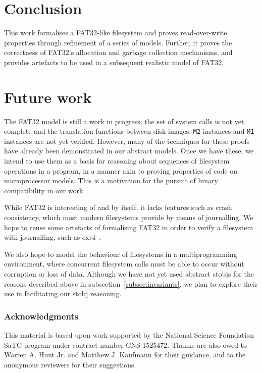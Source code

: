 \documentclass[submission,copyright,creativecommons]{eptcs}
\begin{document}


\section{Conclusion}

This work formalises a FAT32-like filesystem and proves
read-over-write properties through refinement of a series of
models. Further, it proves the correctness of FAT32's allocation and
garbage collection mechanisms, and provides artefacts to be used in a
subsequent realistic model of FAT32.

\section{Future work}

The FAT32 model is still a work in progress; the set of system calls
is not yet complete and the translation functions between disk images,
\texttt{M2} instances and \texttt{M1} instances are not yet
verified. However, many of the techniques for these proofs have
already been demonstrated in our abstract models. Once we have these,
we intend to use them as a basis for
reasoning about sequences of filesystem operations in a program, in a
manner akin to proving properties of code on microprocessor
models. This is a motivation for the pursuit of binary compatibility
in our work.

While FAT32 is interesting of and by itself, it lacks features such as
crash consistency, which most modern filesystems provide by means of
journalling. We hope to reuse some artefacts of formalising FAT32 in
order to verify a filesystem with journalling, such as
ext4~\cite{mathur2007new}.

We also hope to model the behaviour of filesystems in a
multiprogramming environment, where concurrent filesystem calls must
be able to occur without corruption or loss of data. Although we have
not yet used abstract stobjs for the reasons described
above in subsection~\ref{subsec:invariants}, we plan to explore their
use in facilitating our stobj reasoning.

\subsubsection*{Acknowledgments} This material is based upon work
supported by the National Science Foundation SaTC program under
contract number CNS-1525472. Thanks are also owed to Warren A. Hunt
Jr. and Matthew J. Kaufmann for their guidance, and to the anonymous
reviewers for their suggestions.



\end{document}
